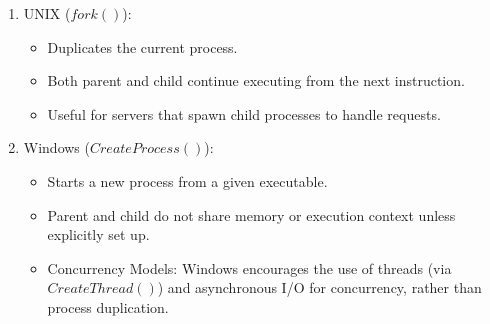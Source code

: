 \documentclass[titlepage]{article}\pagestyle{empty}
\begin{document}
\begin{enumerate}
  \item UNIX ($fork()$):

    \begin{itemize}
      \item Duplicates the current process.
      \item Both parent and child continue executing from the next instruction.
      \item Useful for servers that spawn child processes to handle requests.
    \end{itemize}
  \item Windows ($CreateProcess()$):

    \begin{itemize}
      \item Starts a new process from a given executable.
      \item Parent and child do not share memory or execution context unless explicitly set up.
      \item Concurrency Models:
Windows encourages the use of threads (via $CreateThread()$) and asynchronous I/O for concurrency, rather than process duplication.
    \end{itemize}
\end{enumerate}
\end{document}
